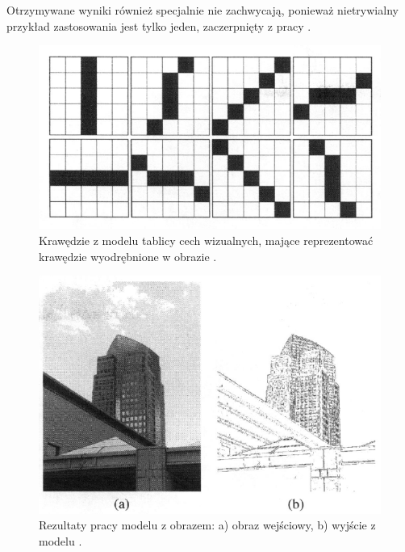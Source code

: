 Otrzymywane wyniki również specjalnie nie zachwycają, ponieważ nietrywialny przykład zastosowania jest tylko jeden, zaczerpnięty z pracy \cite{Resko2005}. 

\begin{figure}[ht]
	\centering
	\includegraphics[width=.60\textwidth]{images/vfa_model_neurons.png}
	\caption{Krawędzie z modelu tablicy cech wizualnych, mające reprezentować krawędzie wyodrębnione w obrazie \cite{Resko2005}.}
	\label{fig:vfaModelNeurons}
\end{figure}

\begin{figure}[ht]
	\centering
	\includegraphics[width=.70\textwidth]{images/vfa_model_results.png}
	\caption{Rezultaty pracy modelu z obrazem: a) obraz wejściowy, b) wyjście z modelu \cite{Resko2005}.}
	\label{fig:vfaModelResults}
\end{figure}
